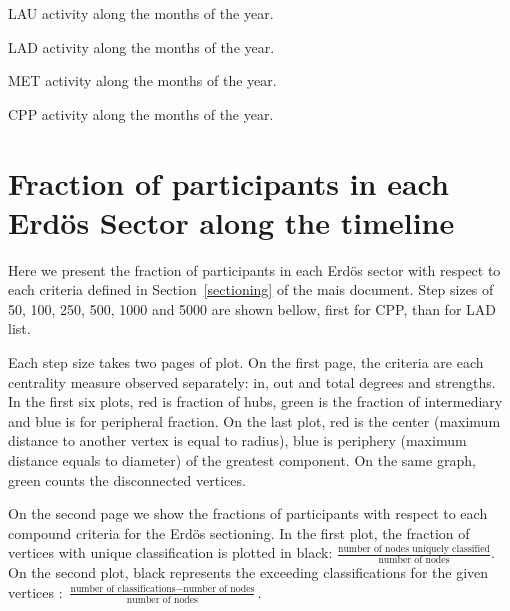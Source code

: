 \documentclass[%
 aip,
 jmp,%
 amsmath,amssymb,
 reprint,%
 floatfix,
]{revtex4-1}
\begin{document}
\begin{table}[!h]
	\caption{LAU activity along the months of the year.}
	\footnotesize
	
\label{tab:min2}
\end{table}
\begin{table}[!h]
	\caption{LAD activity along the months of the year.}
	\footnotesize
	
\label{tab:min2}
\end{table}
\begin{table}[!h]
	\caption{MET activity along the months of the year.}
	\footnotesize
	
\label{tab:min2}
\end{table}

\begin{table}[!h]
	\caption{CPP activity along the months of the year.}
	\footnotesize
	
\label{tab:min2}
\end{table}



\section{Fraction of participants in each Erd\"os Sector along the timeline}\label{sec:frac}
Here we present the fraction of participants in each Erd\"os sector with respect to each criteria defined in Section~\ref{sectioning} of the mais document. Step sizes of 50, 100, 250, 500, 1000 and 5000 are shown bellow, first for CPP, than for  LAD list.

Each step size takes two pages of plot. On the first page, the criteria are each centrality measure observed separately: in, out and total degrees and strengths. In the first six plots, red is fraction of hubs, green is the fraction of intermediary and blue is for peripheral fraction. On the last plot, red is the center (maximum distance to another vertex is equal to radius), blue is periphery (maximum distance equals to diameter) of the greatest component. On the same graph, green counts the disconnected vertices.

On the second page we show the fractions of participants with respect to each compound criteria for the Erd\"os sectioning. In the first plot, the fraction of vertices with unique classification is plotted in black: $\frac{\text{number of nodes uniquely classified}}{\text{number of nodes}}$. On the second plot, black represents the exceeding classifications for the given vertices : $\frac{\text{number of classifications} - \text{number of nodes}}{\text{number of nodes}}$.
\end{document}
